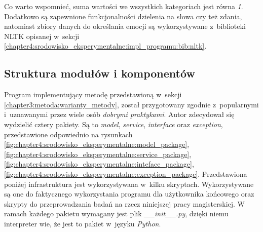 \documentclass[../Kamil_Kowalewski_Main.tex]{subfiles}
\begin{document}
{{{{                Co warto wspomnieć, suma wartości we wszystkich kategoriach jest równa
                \textit{1}. Dodatkowo są zapewnione funkcjonalności dzielenia na słowa
                czy też zdania, natomiast zbiory danych do określania emocji są
                wykorzystywane z~biblioteki NLTK opisanej w~sekcji
                \ref{chapter4:srodowisko_eksperymentalne:impl_programu:bib:nltk}.
            }

        }

        \subsection{Struktura modułów i komponentów}
        \label{chapter4:srodowisko_eksperymentalne:impl_programu:struktura} {
            Program implementujący metodę przedstawioną w~sekcji
            \ref{chapter3:metoda:warianty_metody}, został przygotowany zgodnie
            z~popularnymi i~uznawanymi przez wiele osób \textit{dobrymi praktykami}.
            Autor zdecydował się wydzielić cztery pakiety. Są to \textit{model},
            \textit{service}, \textit{interface} oraz \textit{exception}, przedstawione
            odpowiednio na rysunkach
            \ref{fig:chapter4:srodowisko_eksperymentalne:model_package},
            \ref{fig:chapter4:srodowisko_eksperymentalne:service_package},
            \ref{fig:chapter4:srodowisko_eksperymentalne:inteface_package},
            \ref{fig:chapter4:srodowisko_eksperymentalne:exception_package}.
            Przedstawiona poniżej infrastruktura jest wykorzystywana w~kilku skryptach.
            Wykorzystywane są one do faktycznego wykorzystania programu dla użytkownika
            końcowego oraz skrypty do przeprowadzania badań na rzecz niniejszej pracy
            magisterskiej. W ramach każdego pakietu wymagany jest plik
            \textit{\_\_init\_\_.py}, dzięki niemu interpreter wie, że jest to pakiet
            w~języku \textit{Python}.

}}}
\end{document}
